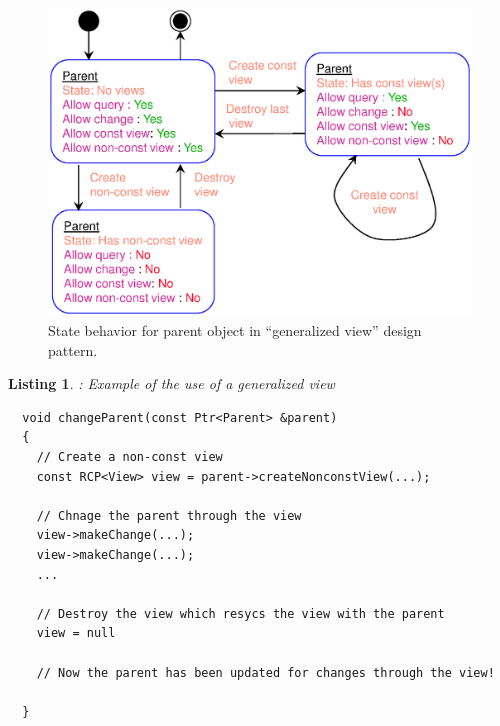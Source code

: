 \documentclass[pdf,ps2pdf,11pt]{SANDreport}
\newtheorem{listing}{Listing}
\begin{document}
{\bsinglespace
\begin{figure}[p]
\begin{center}
\includegraphics*[angle=0,scale=0.65]{GeneralizedViewStateDiagram}
\end{center}
\caption{
\label{fig:GeneralizedViewStateDiagram}
State behavior for parent object in ``generalized view'' design
pattern.}
\end{figure}
\esinglespace}


\begin{listing}:  Example of the use of a generalized view  \\
\label{listing:generalized-view-ex1}
{\small\begin{verbatim}
  void changeParent(const Ptr<Parent> &parent)
  {
    // Create a non-const view
    const RCP<View> view = parent->createNonconstView(...);

    // Chnage the parent through the view
    view->makeChange(...);
    view->makeChange(...);
    ...

    // Destroy the view which resycs the view with the parent
    view = null

    // Now the parent has been updated for changes through the view!

  }
\end{verbatim}}
\end{listing}
\end{document}
